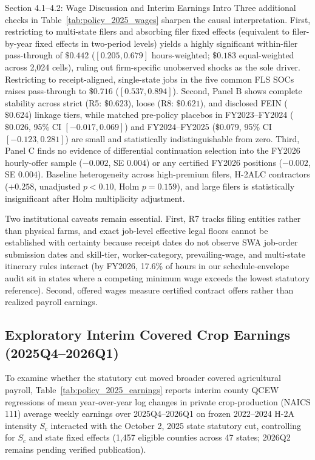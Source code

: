 \begin{llmdraft}{Section 4.1--4.2: Wage Discussion and Interim Earnings Intro}
Three additional checks in Table~\ref{tab:policy_2025_wages} sharpen the causal
interpretation. First, restricting to multi-state filers and absorbing filer
fixed effects (equivalent to filer-by-year fixed effects in two-period levels)
yields a highly significant within-filer pass-through of $\$0.442$ ($[0.205,
0.679]$ hours-weighted; $\$0.183$ equal-weighted across 2,024 cells), ruling
out firm-specific unobserved shocks as the sole driver. Restricting to
receipt-aligned, single-state jobs in the five common FLS SOCs raises
pass-through to $\$0.716$ ($[0.537, 0.894]$). Second, Panel B shows complete
stability across strict (R5: $\$0.623$), loose (R8: $\$0.621$), and
disclosed FEIN ($\$0.624$) linkage tiers, while matched pre-policy placebos
in FY2023--FY2024 ($\$0.026$, 95\% CI $[-0.017, 0.069]$) and FY2024--FY2025
($\$0.079$, 95\% CI $[-0.123, 0.281]$) are small and statistically
indistinguishable from zero. Third, Panel C finds no evidence of differential
continuation selection into the FY2026 hourly-offer sample ($-0.002$, SE
$0.004$) or any certified FY2026 positions ($-0.002$, SE $0.004$). Baseline
heterogeneity across high-premium filers, H-2ALC contractors ($+0.258$,
unadjusted $p<0.10$, Holm $p=0.159$), and large filers is statistically
insignificant after Holm multiplicity adjustment.

Two institutional caveats remain essential. First, R7 tracks filing entities
rather than physical farms, and exact job-level effective legal floors cannot
be established with certainty because receipt dates do not observe SWA
job-order submission dates and skill-tier, worker-category, prevailing-wage,
and multi-state itinerary rules interact (by FY2026, 17.6\% of hours in our
schedule-envelope audit sit in states where a competing minimum wage exceeds
the lowest statutory reference). Second, offered wages measure certified
contract offers rather than realized payroll earnings.

\subsection{Exploratory Interim Covered Crop Earnings (2025Q4--2026Q1)}

To examine whether the statutory cut moved broader covered agricultural
payroll, Table~\ref{tab:policy_2025_earnings} reports interim county QCEW
regressions of mean year-over-year log changes in private crop-production
(NAICS 111) average weekly earnings over 2025Q4--2026Q1 on frozen 2022--2024
H-2A intensity $S_c$ interacted with the October 2, 2025 state statutory cut,
controlling for $S_c$ and state fixed effects (1,457 eligible counties across
47 states; 2026Q2 remains pending verified publication).
\end{llmdraft}

